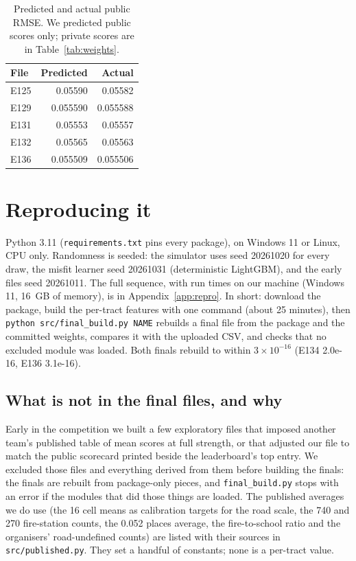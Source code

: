 \documentclass[10pt,twocolumn,a4paper]{article}
\newcommand{\code}[1]{\texttt{\small #1}}
\begin{document}
\begin{table}[t]
\centering\small
\caption{Predicted and actual public RMSE. We predicted public scores only; private scores are in Table~\ref{tab:weights}.}
\label{tab:valid}
\begin{tabular}{@{}lrr@{}}
\toprule
File & Predicted & Actual\\
\midrule
E125 & 0.05590 & 0.05582\\
E129 & 0.055590 & 0.055588\\
E131 & 0.05553 & 0.05557\\
E132 & 0.05565 & 0.05563\\
E136 & 0.055509 & 0.055506\\
\bottomrule
\end{tabular}
\end{table}

\section{Reproducing it}
\label{sec:repro}
Python 3.11 (\code{requirements.txt} pins every package), on Windows 11 or Linux, CPU only. Randomness is seeded: the
simulator uses seed 20261020 for every draw, the misfit learner seed 20261031 (deterministic LightGBM), and the early
files seed 20261011. The full sequence, with run times on our machine (Windows 11, 16~GB of memory), is in
Appendix~\ref{app:repro}. In short: download the package, build the per-tract features with one command (about 25
minutes), then \code{python src/final\_build.py NAME} rebuilds a final file from the package and the committed weights,
compares it with the uploaded CSV, and checks that no excluded module was loaded. Both finals rebuild to within
$3\times10^{-16}$ (E134 2.0e-16, E136 3.1e-16).

\subsection{What is not in the final files, and why}
\label{sec:excluded}
Early in the competition we built a few exploratory files that imposed another team's published table of mean scores at
full strength, or that adjusted our file to match the public scorecard printed beside the leaderboard's top entry. We
excluded those files and everything derived from them before building the finals: the finals are rebuilt from
package-only pieces, and \code{final\_build.py} stops with an error if the modules that did those things are loaded. The
published averages we do use (the 16 cell means as calibration targets for the road scale, the 740 and 270 fire-station
counts, the 0.052 places average, the fire-to-school ratio and the organisers' road-undefined counts) are listed with
their sources in \code{src/published.py}. They set a handful of constants; none is a per-tract value.
\end{document}
